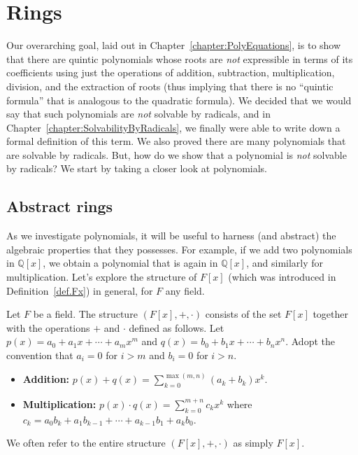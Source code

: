 \chapter{Rings}
\label{chapter:Rings}
\thispagestyle{empty}
Our overarching goal, laid out in Chapter~\ref{chapter:PolyEquations}, is to show that there are quintic polynomials whose roots are \emph{not} expressible in terms of its coefficients using just the operations of addition, subtraction, multiplication, division, and the extraction of roots (thus implying that there is no ``quintic formula'' that is analogous to the quadratic formula). We decided that we would say that such polynomials are \emph{not} solvable by radicals, and in Chapter~\ref{chapter:SolvabilityByRadicals}, we finally were able to write down a formal definition of this term. We also proved there are many polynomials that are solvable by radicals. But, how do we show that a polynomial  is \emph{not} solvable by radicals? We start by taking a closer look at polynomials.


\section{Abstract rings}
As we investigate polynomials, it will be useful to harness (and abstract) the algebraic properties that they possesses. For example, if we add two polynomials in $\mathbb{Q}[x]$, we obtain a polynomial that is again in $\mathbb{Q}[x]$, and similarly for multiplication. Let's explore the structure of $F[x]$ (which was introduced in Definition~\ref{def.Fx}) in general, for $F$  any field.

\begin{definition}
Let $F$ be a field. The structure $(F[x],+,\cdot)$ consists of the set $F[x]$ together with the operations $+$ and $\cdot$ defined as follows. Let $p(x) = a_0 + a_1x + \cdots + a_mx^m$ and $q(x) = b_0 + b_1x + \cdots + b_nx^n$. Adopt the convention that $a_i = 0$ for $i>m$ and $b_i = 0$ for $i>n$.
\begin{itemize}
\item \textbf{Addition:} $p(x) + q(x) =  \displaystyle\sum_{k=0}^{\max(m,n)}(a_k + b_k)x^k$.
\item \textbf{Multiplication:} $p(x)\cdot q(x) = \displaystyle\sum_{k=0}^{m+n}c_kx^k$ where $c_k = a_0b_k + a_1b_{k-1} + \cdots + a_{k-1}b_1 + a_kb_0$.
\end{itemize}
We often refer to the entire structure $(F[x],+,\cdot)$ as simply $F[x]$.
\end{definition}

